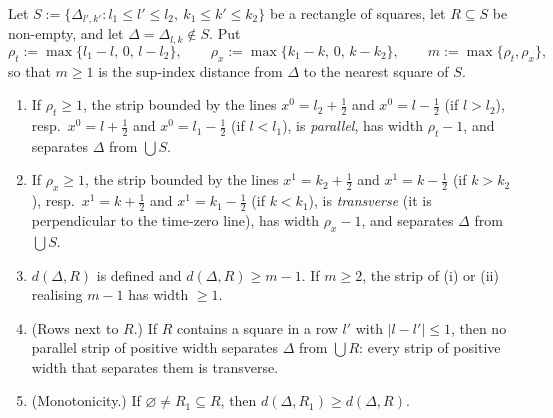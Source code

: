 \begin{auxlemma}\label{aux:notation-strip}
Let $S:=\{\Delta_{l',k'}:l_1\le l'\le l_2,\ k_1\le k'\le k_2\}$ be a rectangle of squares, let
$R\subseteq S$ be non-empty, and let $\Delta=\Delta_{l,k}\notin S$.  Put
\[
 \rho_t:=\max\{l_1-l,\,0,\,l-l_2\},\qquad\rho_x:=\max\{k_1-k,\,0,\,k-k_2\},\qquad
 m:=\max\{\rho_t,\rho_x\},
\]
so that $m\ge1$ is the sup-index distance from $\Delta$ to the nearest square of $S$.
\begin{enumerate}
\item[\textup{(i)}] If $\rho_t\ge1$, the strip bounded by the lines $x^0=l_2+\frac12$ and
$x^0=l-\frac12$ (if $l>l_2$), resp.\ $x^0=l+\frac12$ and $x^0=l_1-\frac12$ (if $l<l_1$), is
\emph{parallel}, has width $\rho_t-1$, and separates $\Delta$ from $\bigcup S$.
\item[\textup{(ii)}] If $\rho_x\ge1$, the strip bounded by the lines $x^1=k_2+\frac12$ and
$x^1=k-\frac12$ (if $k>k_2$), resp.\ $x^1=k+\frac12$ and $x^1=k_1-\frac12$ (if $k<k_1$), is
\emph{transverse} (it is perpendicular to the time-zero line), has width $\rho_x-1$, and
separates $\Delta$ from $\bigcup S$.
\item[\textup{(iii)}] $d(\Delta,R)$ is defined and $d(\Delta,R)\ge m-1$.  If $m\ge2$, the
strip of \textup{(i)} or \textup{(ii)} realising $m-1$ has width $\ge1$.
\item[\textup{(iv)}] \textup{(Rows next to $R$.)}  If $R$ contains a square in a row $l'$
with $|l-l'|\le1$, then no parallel strip of positive width separates $\Delta$ from
$\bigcup R$: every strip of positive width that separates them is transverse.
\item[\textup{(v)}] \textup{(Monotonicity.)}  If $\varnothing\ne R_1\subseteq R$, then
$d(\Delta,R_1)\ge d(\Delta,R)$.
\end{enumerate}
\end{auxlemma}

